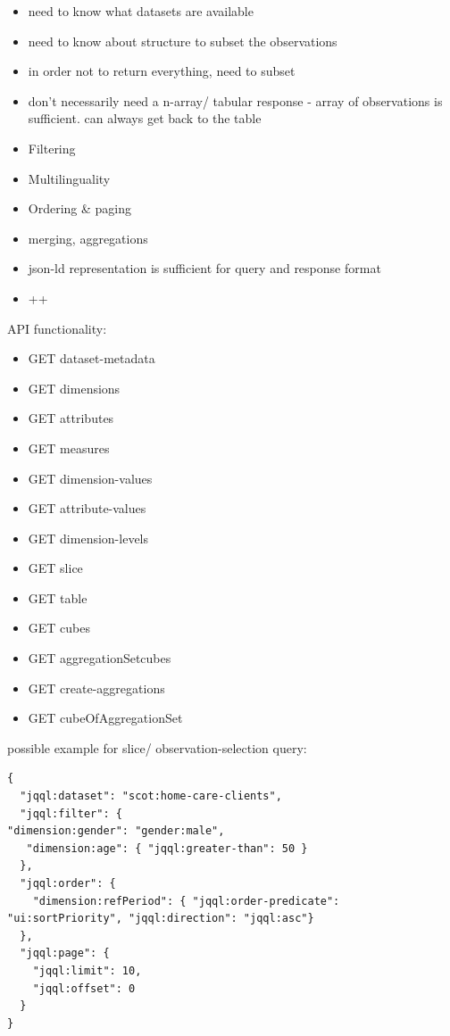 \documentclass{llncs}
\begin{document}
\begin{itemize}
\item need to know what datasets are available
\item need to know about structure to subset the observations
\item in order not to return everything, need to subset
\item don't necessarily need a n-array/ tabular response - array of observations is sufficient. can always get back to the table
\item Filtering
\item Multilinguality
\item Ordering \& paging
\item merging, aggregations
\item json-ld representation is sufficient for query and response format
\item ++
\end{itemize}

API functionality:
\begin{itemize}
\item GET dataset-metadata
\item GET dimensions
\item GET attributes
\item GET measures
\item GET dimension-values
\item GET attribute-values
\item GET dimension-levels
\item GET slice
\item GET table
\item GET cubes
\item GET aggregationSetcubes
\item GET create-aggregations
\item GET cubeOfAggregationSet
\end{itemize}

\cite{Janssen:2012}

possible example for slice/ observation-selection query:
\begin{verbatim} 
{ 
  "jqql:dataset": "scot:home-care-clients",
  "jqql:filter": {
"dimension:gender": "gender:male",
   "dimension:age": { "jqql:greater-than": 50 }
  },
  "jqql:order": {
    "dimension:refPeriod": { "jqql:order-predicate": "ui:sortPriority", "jqql:direction": "jqql:asc"}
  },
  "jqql:page": {
    "jqql:limit": 10,
    "jqql:offset": 0
  }
}
\end{verbatim}
\end{document}
